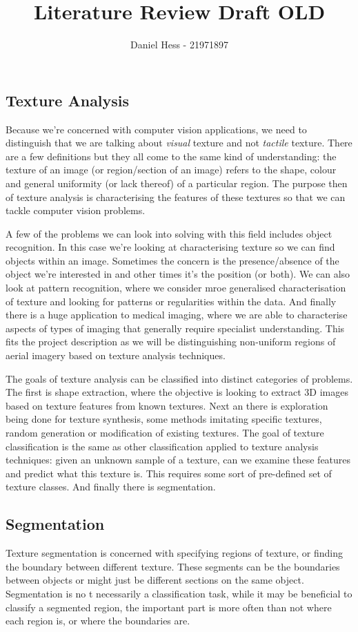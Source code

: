 \documentclass[a4]{article}
\title{Literature Review Draft OLD}
\author{Daniel Hess - 21971897}
\date{}
\begin{document}
\maketitle

\subsection*{Texture Analysis}
Because we're concerned with computer vision applications, we need to distinguish that we are talking about \textit{visual} texture and not \textit{tactile} texture. There are a few definitions but they all come to the same kind of understanding: the texture of an image (or region/section of an image) refers to the shape, colour and general uniformity (or lack thereof) of a particular region. The purpose then of texture analysis is characterising the features of these textures so that we can tackle computer vision problems.

A few of the problems we can look into solving with this field includes object recognition. In this case we're looking at characterising texture so we can find objects within an image. Sometimes the concern is the presence/absence of the object we're interested in and other times it's the position (or both). We can also look at pattern recognition, where we consider mroe generalised characterisation of texture and looking for patterns or regularities within the data. And finally there is a huge application to medical imaging, where we are able to characterise aspects of types of imaging that generally require specialist understanding. This fits the project description as we will be distinguishing non-uniform regions of aerial imagery based on texture analysis techniques.

The goals of texture analysis can be classified into distinct categories of problems. The first is shape extraction, where the objective is looking to extract 3D images based on texture features from known textures. Next an there is exploration being done for texture synthesis, some methods imitating specific textures, random generation or modification of existing textures. The goal of texture classification is the same as other classification applied to texture analysis techniques: given an unknown sample of a texture, can we examine these features and predict what this texture is. This requires some sort of pre-defined set of texture classes. And finally there is segmentation.

\subsection*{Segmentation}
Texture segmentation is concerned with specifying regions of texture, or finding the boundary between different texture. These segments can be the boundaries between objects or might just be different sections on the same object. Segmentation is no t necessarily a classification task, while it may be beneficial to classify a segmented region, the important part is more often than not where each region is, or where the boundaries are. 
\end{document}
